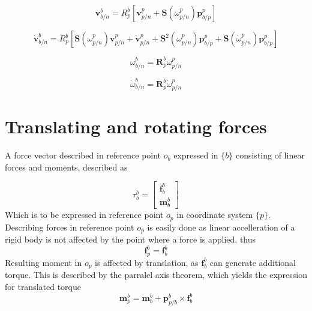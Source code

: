 \begin{equation}
\textbf{v}_{b/n}^{b} = R_{p}^{b}[ \textbf{v}_{p/n}^{p} + \textbf{S}(\omega_{p/n}^{p}) \textbf{p}_{b/p}^{p}]
\label{eq:bodyLinearVelocity}
\end{equation}

\begin{equation}
\dot{\textbf{v}}_{b/n}^{b} = R_{p}^{b} [\textbf{S}(\omega_{p/n}^{p}) \textbf{v}_{p/n}^{p} + \dot{\textbf{v}}_{p/n}^{p} + \textbf{S}^{2}(\omega_{p/n}^{p}) \textbf{p}_{b/p}^{p} + \textbf{S}(\dot{\omega}_{p/n}^{p})\textbf{p}_{b/p}^{p} ]
\label{eq:bodyLinearAccelleration}
\end{equation}


\begin{equation}
\omega_{b/n}^{b} = \textbf{R}_{p}^{b}\omega_{p/n}^{p}
\label{eq:bodyAngularVelocity}
\end{equation}

\begin{equation}
\dot{\omega}_{b/n}^{b} = \textbf{R}_{p}^{b} \dot{\omega}_{p/n}^{p}
\label{eq:bodyAngularAccelleration}
\end{equation}

\section{Translating and rotating forces}
A force vector described in reference point $o_{b}$ expressed in $\{b\}$ consisting of linear forces and moments, described as

\begin{equation}
\tau_{b}^{b} = \begin{bmatrix} \textbf{f}_{b}^b \\[10pt] 
\textbf{m}_{b}^{b}
\end{bmatrix}
\end{equation}
Which is to be expressed in reference point $o_{p}$ in coordinate system $\{p\}$. Describing forces in reference point $o_{p}$ is easily done as linear accelleration of a rigid body is not affected by the point where a force is applied, thus
\begin{equation}
	\textbf{f}_{p}^b = \textbf{f}_{b}^b
	\label{eq:forceTranslated1}
\end{equation}
Resulting moment in $o_{p}$ is affected by translation, as $\textbf{f}_{b}^b$ can generate additional torque. This is described by the parralel axis theorem, which yields the expression for translated torque
\begin{equation}
\textbf{m}_{p}^b = \textbf{m}_{b}^b + \textbf{p}_{p/b}^{b} \times \textbf{f}_{b}^b
\label{eq:momentTranslated1}
\end{equation}

